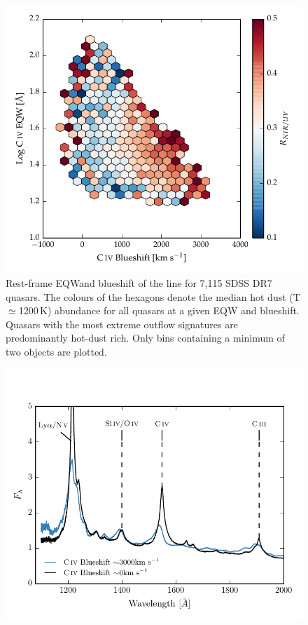 \begin{figure}
\centering
  \includegraphics[width=\columnwidth]{figures/chapter05/hot_dust_beta.pdf}
\caption[{Hot dust abundance as a function of rest-frame EQW and blueshift of the  line.}]{Rest-frame EQWand blueshift of the  line for 7,115 SDSS DR7 quasars. The colours of the hexagons denote the median hot dust (T$\simeq$1200\,K) abundance for all quasars at a given EQW and blueshift. Quasars with the most extreme outflow signatures are predominantly hot-dust rich. Only bins containing a minimum of two objects are plotted. }
  \label{fig:hot_dust_beta}
\end{figure}

\begin{figure}
\centering
  \includegraphics[width=\columnwidth]{figures/chapter05/blueshift_composite.pdf}
\caption{}
  \label{fig:blueshift_composite}
\end{figure}

